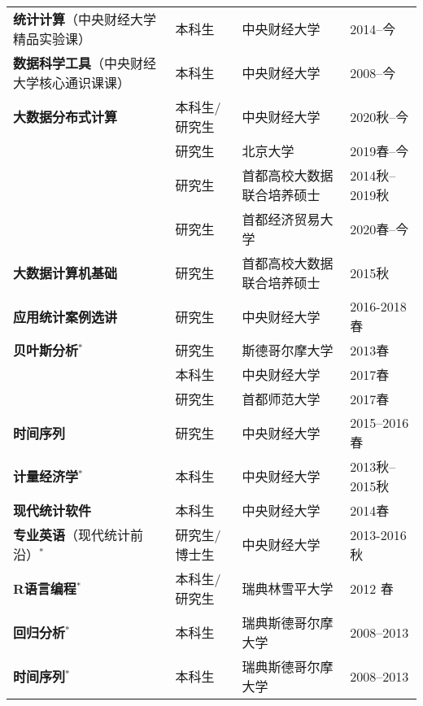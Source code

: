 \documentclass[twoside,a4paper,10pt]{amsart}
\begin{document}
\begin{tabular}{l l ll}
  \textbf{统计计算}（中央财经大学精品实验课）       & 本科生        & 中央财经大学               & 2014--今       \\
  \textbf{数据科学工具}（中央财经大学核心通识课课） & 本科生        & 中央财经大学               & 2008--今       \\
  \textbf{大数据分布式计算}                         & 本科生/研究生 & 中央财经大学               & 2020秋--今     \\
                                                    & 研究生        & 北京大学                   & 2019春--今     \\
                                                    & 研究生        & 首都高校大数据联合培养硕士 & 2014秋--2019秋 \\
                                                    & 研究生        & 首都经济贸易大学           & 2020春--今     \\
  \textbf{大数据计算机基础}                         & 研究生        & 首都高校大数据联合培养硕士 & 2015秋         \\
  \textbf{应用统计案例选讲}                         & 研究生        & 中央财经大学               & 2016-2018春    \\
  \textbf{贝叶斯分析}$^*$                           & 研究生        & 斯德哥尔摩大学             & 2013春         \\
                                                    & 本科生        & 中央财经大学               & 2017春         \\
                                                    & 研究生        & 首都师范大学               & 2017春         \\
  \textbf{时间序列}                                 & 研究生        & 中央财经大学               & 2015--2016春   \\
  \textbf{计量经济学}$^*$                           & 本科生        & 中央财经大学               & 2013秋--2015秋 \\
  \textbf{现代统计软件}                             & 本科生        & 中央财经大学               & 2014春         \\
  \textbf{专业英语}（现代统计前沿）$^*$             & 研究生/博士生 & 中央财经大学               & 2013-2016秋    \\

  \textbf{R语言编程}$^*$&本科生/研究生&瑞典林雪平大学&  2012 春\\
  \textbf{回归分析}$^*$&本科生&瑞典斯德哥尔摩大学&2008--2013\\
  \textbf{时间序列}$^*$&本科生&瑞典斯德哥尔摩大学&2008--2013\\
\end{tabular}
\end{document}
